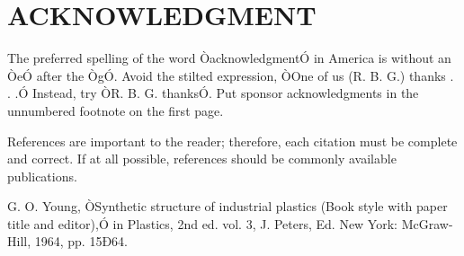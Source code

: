 \documentclass[a4paper, 10pt, conference]{ieeeconf}      %
\begin{document}
\section*{ACKNOWLEDGMENT}

The preferred spelling of the word ÒacknowledgmentÓ in America is without an ÒeÓ after the ÒgÓ. Avoid the stilted expression, ÒOne of us (R. B. G.) thanks . . .Ó  Instead, try ÒR. B. G. thanksÓ. Put sponsor acknowledgments in the unnumbered footnote on the first page.




References are important to the reader; therefore, each citation must be complete and correct. If at all possible, references should be commonly available publications.








































\begin{thebibliography}{99}

 G. O. Young, ÒSynthetic structure of industrial plastics (Book style with paper title and editor),Ó 	in Plastics, 2nd ed. vol. 3, J. Peters, Ed.  New York: McGraw-Hill, 1964, pp. 15Ð64.

\end{thebibliography}
\end{document}

